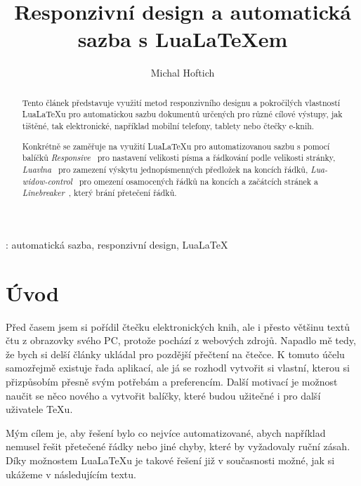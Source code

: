 \documentclass{csbulletin}
\newcommand\balicek[1]{\textit{#1}}
\newcommand\program[1]{#1}
\begin{document}
\title{Responzivní design a automatická sazba s Lua\LaTeX em}
\author{Michal Hoftich}
\maketitle

\begin{abstract}
Tento článek představuje využití metod responzivního designu a pokročilých vlastností
Lua\LaTeX u pro automatickou sazbu dokumentů určených pro různé cílové výstupy,
jak tištěné, tak elektronické, například mobilní telefony, tablety nebo čtečky e-knih.


Konkrétně se zaměřuje na využití Lua\LaTeX u pro automatizovanou
sazbu s pomocí balíčků \balicek{Responsive}~\cite{responsive} pro nastavení velikosti písma a řádkování 
podle velikosti stránky, \balicek{Luavlna}~\cite{luavlna} pro zamezení výskytu jednopísmenných předložek
na koncích řádků, \balicek{Lua-widow-control}~\cite{lua-widow-control} pro omezení osamocených řádků na koncích a
začátcích stránek a \balicek{Linebreaker}~\cite{linebreaker}, který brání přetečení řádků.

\end{abstract}
\klicovaslova: automatická sazba, responzivní design, Lua\LaTeX


\section{Úvod}

Před časem jsem si pořídil čtečku elektronických knih, ale i přesto většinu
textů čtu z obrazovky svého PC, protože pochází z webových zdrojů. 
Napadlo mě tedy, že bych si delší články ukládal pro pozdější
přečtení na čtečce. K tomuto účelu samozřejmě existuje řada aplikací, ale 
já se rozhodl vytvořit si vlastní, kterou si přizpůsobím přesně svým potřebám
a preferencím. Další motivací je možnost naučit se něco nového a vytvořit
balíčky, které budou užitečné i pro další uživatele \TeX u. 

Mým cílem je, aby řešení bylo co nejvíce automatizované, abych například nemusel
řešit přetečené řádky nebo jiné chyby, které by vyžadovaly ruční zásah. 
Díky možnostem Lua\LaTeX u je takové řešení již v současnosti možné, 
jak si ukážeme v následujícím textu.


\end{document}

